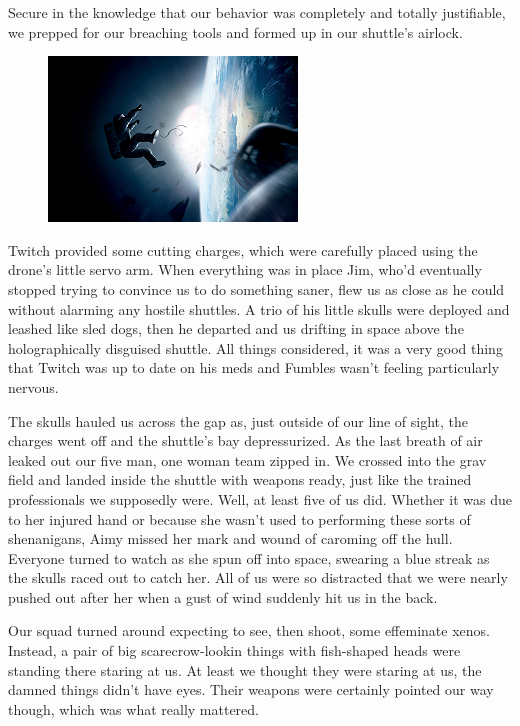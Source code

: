 Secure in the knowledge that our behavior was completely and totally justifiable, we prepped for our breaching tools and formed up in our shuttle’s airlock.

\begin{figure}
	\begin{center}
		\includegraphics[width=\figwidth]{pics/11/49.png}
	\end{center}
\end{figure}
Twitch provided some cutting charges, which were carefully placed using the drone’s little servo arm. 
When everything was in place Jim, who’d eventually stopped trying to convince us to do something saner, flew us as close as he could without alarming any hostile shuttles. 
A trio of his little skulls were deployed and leashed like sled dogs, then he departed and us drifting in space above the holographically disguised shuttle. 
All things considered, it was a very good thing that Twitch was up to date on his meds and Fumbles wasn’t feeling particularly nervous.
 
The skulls hauled us across the gap as, just outside of our line of sight, the charges went off and the shuttle’s bay depressurized. 
As the last breath of air leaked out our five man, one woman team zipped in. 
We crossed into the grav field and landed inside the shuttle with weapons ready, just like the trained professionals we supposedly were. 
Well, at least five of us did. 
Whether it was due to her injured hand or because she wasn’t used to performing these sorts of shenanigans, Aimy missed her mark and wound of caroming off the hull. 
Everyone turned to watch as she spun off into space, swearing a blue streak as the skulls raced out to catch her. 
All of us were so distracted that we were nearly pushed out after her when a gust of wind suddenly hit us in the back.
 
Our squad turned around expecting to see, then shoot, some effeminate xenos. 
Instead, a pair of big scarecrow-lookin things with fish-shaped heads were standing there staring at us. 
At least we thought they were staring at us, the damned things didn’t have eyes. 
Their weapons were certainly pointed our way though, which was what really mattered.

